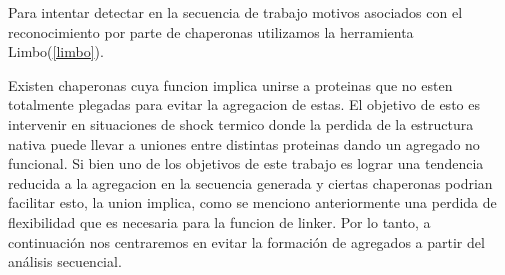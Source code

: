 

Para intentar detectar en la secuencia de trabajo motivos asociados con el reconocimiento por parte de chaperonas utilizamos la herramienta Limbo(\ref{limbo}). 



Existen chaperonas cuya funcion implica unirse a proteinas que no esten totalmente plegadas para evitar la agregacion de estas. 
El objetivo de esto es intervenir en situaciones de shock termico donde la perdida de la estructura nativa puede llevar a uniones entre distintas proteinas dando un agregado no funcional.
Si bien uno de los objetivos de este trabajo es lograr una tendencia reducida a la agregacion en la secuencia generada y 
ciertas chaperonas podrian facilitar esto, la union implica, como se menciono anteriormente una perdida de flexibilidad que es necesaria para la funcion de linker. 
Por lo tanto, a continuación nos centraremos en evitar la formación de agregados a partir del análisis secuencial.





